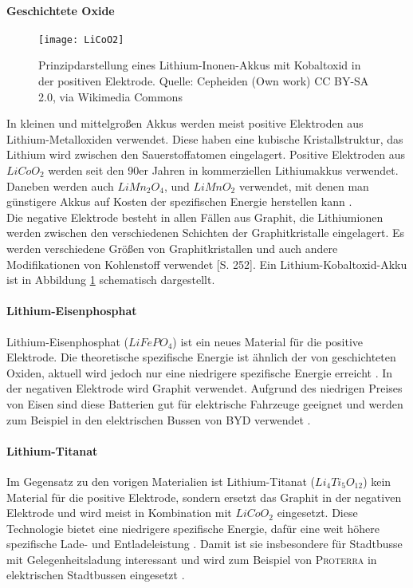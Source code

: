 \paragraph{Geschichtete Oxide}
\begin{figure}\centering
	 \texttt{[image: LiCoO2]}
	 \caption{Prinzipdarstellung eines Lithium-Inonen-Akkus mit Kobaltoxid in der positiven Elektrode. Quelle: Cepheiden (Own work) CC BY-SA 2.0, via Wikimedia Commons}
	 \label{abb_LiCoO2}
\end{figure}
In kleinen und mittelgroßen Akkus werden meist positive Elektroden aus Lithium-Metalloxiden verwendet. Diese haben eine kubische Kristallstruktur, das Lithium wird zwischen den Sauerstoffatomen eingelagert. Positive Elektroden aus $LiCoO_2$ werden seit den 90er Jahren in kommerziellen Lithiumakkus verwendet. Daneben werden auch $LiMn_2O_4$, und $LiMnO_2$ verwendet, mit denen man günstigere Akkus auf Kosten der spezifischen Energie herstellen kann \cite{whittingham2004lithium}.\\ %
Die negative Elektrode besteht in allen Fällen aus Graphit, die Lithiumionen werden zwischen den verschiedenen Schichten der Graphitkristalle eingelagert. Es werden verschiedene Größen von Graphitkristallen und auch andere Modifikationen von Kohlenstoff verwendet \cite{Sterner:2014}[S. 252]. Ein Lithium-Kobaltoxid-Akku ist in Abbildung \ref{abb_LiCoO2} schematisch dargestellt.
\paragraph{Lithium-Eisenphosphat}
Lithium-Eisenphosphat ($LiFePO_4$) ist ein neues Material für die positive Elektrode. Die theoretische spezifische Energie ist ähnlich der von geschichteten Oxiden, aktuell wird jedoch nur eine niedrigere spezifische Energie erreicht \cite{Tie201382}. In der negativen Elektrode wird Graphit verwendet. Aufgrund des niedrigen Preises von Eisen sind diese Batterien gut für elektrische Fahrzeuge geeignet und werden zum Beispiel in den elektrischen Bussen von \textsc{BYD} verwendet \cite{bydSpecs}.
\paragraph{Lithium-Titanat}
Im Gegensatz zu den vorigen Materialien ist Lithium-Titanat ($Li_4Ti_5O_{12}$) kein Material für die positive Elektrode, sondern ersetzt das Graphit in der negativen Elektrode und wird meist in Kombination mit $LiCoO_2$ eingesetzt. Diese Technologie bietet eine niedrigere spezifische Energie, dafür eine weit höhere spezifische Lade- und Entladeleistung \cite{veneri2012charging}. Damit ist sie insbesondere für Stadtbusse mit Gelegenheitsladung interessant und wird zum Beispiel von \textsc{Proterra} in elektrischen Stadtbussen eingesetzt \cite{protCat}.

